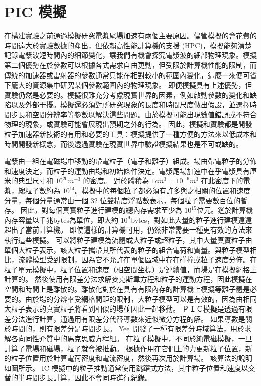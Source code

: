 \section{PIC 模擬}
在構建實驗之前通過模擬研究電漿尾場加速有兩個主要原因。儘管模擬的會花費的時間遠大於實驗數據的產出，但依賴高性能計算機的支援 (HPC)，模擬能夠清楚記錄電漿波短時間內的細節變化，讓我們有機會探究電漿波的細部物理現象。模擬第二個優勢在於參數可以根據各式需求自由更動，但受限於計算機性能的限制，而傳統的加速器或雷射器的參數通常只能在相對較小的範圍內變化，這麼一來便可省下龐大的資源集中研究某個參數範圍內的物理現象。
即便模擬具有上述優勢，但實驗仍然是必要的。模擬很難充分考慮現實世界的因素，例如啟動參數的變化和缺陷以及外部干擾。模擬還必須對所研究現象的長度和時間尺度做出假設，並選擇時間步長和空間分辨率等參數以解決這些問題。由於模擬可能出現數值錯誤或不符合物理的現象，或實驗可能會展現出預期之外的行為。
因此，模擬和實驗都是開發粒子加速器新技術的有用和必要的工具：模擬提供了一種方便的方法來以低成本和時間開發新概念，而後透過實驗在現實世界中驗證模擬結果也是不可或缺的。

電漿由一組在電磁場中移動的帶電粒子（電子和離子）組成。場由帶電粒子的分佈和速度決定，而粒子的運動由場和初始條件決定。電漿尾場加速中在乎電漿具有厘米的典型尺寸和 \(10^{20} m^{-3}\)  的密度。
對於體積為 \(1cm^3 = 10^{-6} m^{3}\) 在此密度下的電漿，總粒子數約為 \(10^{14}\)。模擬中的每個粒子都必須有許多與之相關的位置和速度分量，每個分量通常由一個 32 位雙精度浮點數表示，每個粒子需要數百位的暫存。
因此，對每個真實粒子進行建模的總內存需求至少為 \(10^{15}\)位元。鑑於計算機內存容量以千兆bytes為單位，即大約 \(10^{9}\)bytes，對如此大量的粒子進行建模遠遠超出了當前計算機。
即使這樣的計算機可用，仍然非常需要一種更有效的方法來執行這些模擬。
可以將粒子建模為流體或大粒子或超粒子，其中大量真實粒子由單個大粒子表示，該大粒子攜帶其所代表的粒子的組合電荷和質量。與粒子模型相比，流體模型受到限制，因為它不允許在單個區域中存在碰撞或粒子速度分佈。在粒子單元模擬中，粒子位置和速度（相空間坐標）是連續值，而場是在模擬網格上計算的。
然後使用有限差分法求解麥克斯韋方程和粒子的運動方程，因此模擬在空間和時間上是離散的。離散化對於在具有有限內存的計算機上模擬等離子體是必要的。由於場的分辨率受網格間距的限制，大粒子模型可以是有效的，因為由相同大粒子表示的真實粒子將看到相似的場並因此一起移動。
ＰＩＣ模擬是透過有限差分法進行計算，通過用有限差分代替導數來近似微分方程的解。 如果導數是關於時間的，則有限差分是時間步長。 Yee 開發了一種有限差分時域算法，用於求解各向同性介質中的馬克思威方程組。 在粒子模擬中，不同於純電磁模擬，一旦計算了電場和磁場，粒子就會被推動。 根據作用在它們上的力更新粒子位置，新的粒子位置用於計算電荷密度和電流密度，然後再次用於計算場。 該算法的說明如圖所示。
IC 模擬中的粒子推動通常使用跳躍式方法，其中粒子位置和速度以交替的半時間步長計算，因此不會同時進行紀錄。

